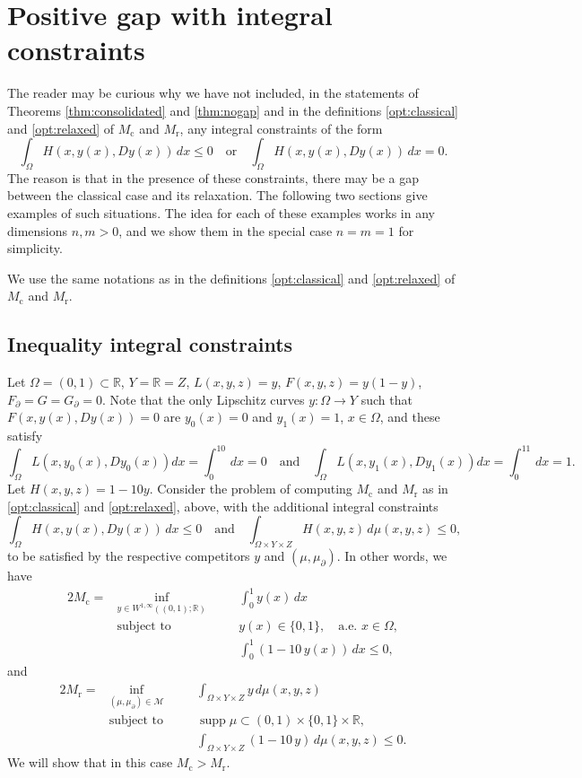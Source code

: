 \documentclass{article}
\newcommand{\R}{\mathbb{R}}
\theoremstyle{definition}
\theoremstyle{remark}
\begin{document}
\section{Positive gap with integral constraints}\label{sec:integralconstraints} 
%
%


 The reader may be curious why we have not included, in the statements of Theorems \ref{thm:consolidated} and \ref{thm:nogap} and in the definitions \eqref{opt:classical} and \eqref{opt:relaxed} of $M_\mathrm{c}$ and $M_\mathrm{r}$, any integral constraints of the form
 \[\int_\Omega H(x,y(x),Dy(x))\,dx \le 0\quad\textrm{or}\quad  \int_\Omega H(x,y(x),Dy(x))\,dx = 0.\] 
 The reason is that  in the presence of these constraints, there may be a gap between the classical case and its relaxation. The following two sections give examples of such situations. The idea for each of these examples works in any dimensions $n,m>0$, and we show them in the special case $n=m=1$ for simplicity.
 
 We use the same notations as in the definitions \ref{opt:classical} and \ref{opt:relaxed} of $M_\mathrm{c}$ and $M_\mathrm{r}$.
 
 \subsection{Inequality integral constraints}
 
 Let $\Omega=(0,1)\subset\R$, $Y=\R=Z$, $L(x,y,z)=y$, $F(x,y,z)=y(1-y)$, $F_\partial=G=G_\partial=0$. Note that the only Lipschitz curves $y\colon\Omega\to Y$  such that $F(x,y(x),Dy(x))=0$ are $y_0(x)=0$ and $y_1(x)=1$, $x\in\Omega$, and these satisfy
 \[\int_{\Omega}L(x,y_0(x),Dy_0(x))dx=\int_0^10\,dx=0\quad\textrm{and}\quad\int_{\Omega}L(x,y_1(x),Dy_1(x))dx=\int_0^11\,dx=1.\]
 Let $H(x,y,z)=1-10y$. Consider the problem of computing $M_\mathrm{c}$ and $M_\mathrm{r}$ as in \ref{opt:classical} and \ref{opt:relaxed}, above, with the additional integral constraints
 \[\int_\Omega H(x,y(x),Dy(x))\,dx\leq 0\quad\textrm{and}\quad \int_{\Omega\times Y\times Z}H(x,y,z)\,d\mu(x,y,z)\leq 0,\]
 to be satisfied by the respective competitors $y$ and $(\mu,\mu_\partial)$.
 In other words, we have
\begin{alignat*}{2}
 M_\mathrm{c}= &\!\inf\limits_{y \in W^{1,\infty}((0,1);\R)}  &\quad &\displaystyle\int_0^1 y(x)\, dx \\ 
 &\textrm{subject to}& & y(x)\in\{ 0,1\},\quad \text{a.e. }x\in \Omega,\nonumber \\
 &&& \textstyle\int_0^1 (1-10\,y(x))\,dx\leq 0,
\end{alignat*}
 and
 \begin{alignat*}{2}
 M_\mathrm{r}=&\!\inf\limits_{(\mu,\mu_\partial)\in \mathcal M}  &\quad&\displaystyle\int_{\Omega\times Y\times Z} y\, d\mu(x,y,z) \\ 
 &\textrm{subject to} %
&& \operatorname{supp}\mu\subset (0,1)\times \{0,1\}\times \R,\nonumber\\ 
&&&\textstyle\int_{\Omega\times Y\times Z}(1-10\,y)\,d\mu(x,y,z)\leq 0.
%
%
\end{alignat*}
 We will show that in this case $M_\mathrm{c}>M_\mathrm{r}$. 
 
\end{document}
